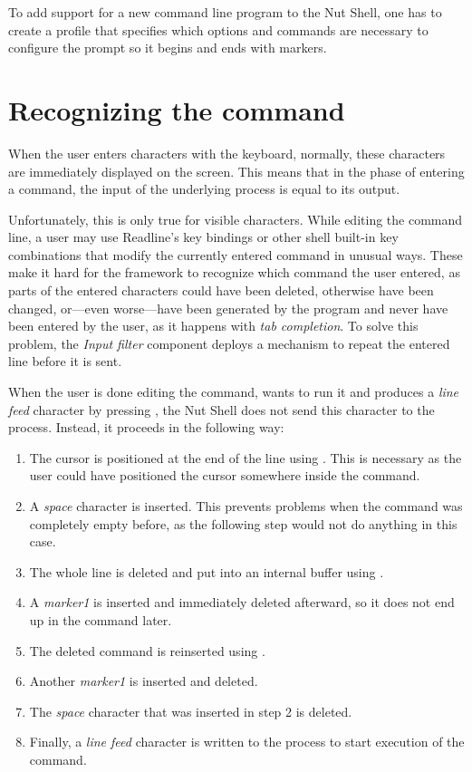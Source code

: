 \documentclass[paper=a4,twoside,abstract=on,cleardoublepage=empty,numbers=noenddot,toc=bib,toc=listof,12pt,appendixprefix=true]{scrreprt}
\begin{document}
To add support for a new command line program to the Nut Shell, one has to create a profile that specifies which options and commands are necessary to configure the prompt so it begins and ends with markers.

\section{Recognizing the command}
\label{sec:reccmd}

When the user enters characters with the keyboard, normally, these characters are immediately displayed on the screen. This means that in the phase of entering a command, the input of the underlying process is equal to its output.

Unfortunately, this is only true for visible characters. While editing the command line, a user may use Readline's key bindings or other shell built-in key combinations that modify the currently entered command in unusual ways. These make it hard for the framework to recognize which command the user entered, as parts of the entered characters could have been deleted, otherwise have been changed, or---even worse---have been generated by the program and never have been entered by the user, as it happens with \emph{tab completion}. To solve this problem, the \emph{Input filter} component deploys a mechanism to repeat the entered line before it is sent.

When the user is done editing the command, wants to run it and produces a \emph{line feed} character by pressing , the Nut Shell does not send this character to the process. Instead, it proceeds in the following way:

\begin{enumerate}
    \item The cursor is positioned at the end of the line using . This is necessary as the user could have positioned the cursor somewhere inside the command.
    \item A \emph{space} character is inserted. This prevents problems when the command was completely empty before, as the following step would not do anything in this case.
    \item The whole line is deleted and put into an internal buffer using \mbox{}.
    \item A \emph{marker1} is inserted and immediately deleted afterward, so it does not end up in the command later.
    \item The deleted command is reinserted using .
    \item Another \emph{marker1} is inserted and deleted.
    \item The \emph{space} character that was inserted in step 2 is deleted.
    \item Finally, a \emph{line feed} character is written to the process to start execution of the command.
\end{enumerate}
\end{document}
